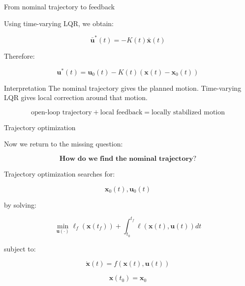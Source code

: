\documentclass[aspectratio=169]{beamer}
\begin{document}
\begin{frame}{From nominal trajectory to feedback}
\large

Using time-varying LQR, we obtain:

\[
\bar{\bm{u}}^*(t)
=
-K(t)\bar{\bm{x}}(t)
\]

Therefore:

\[
\boxed{
\bm{u}^*(t)
=
\bm{u}_0(t)
-
K(t)
\left(
\bm{x}(t)-\bm{x}_0(t)
\right)
}
\]

\vspace{0.4cm}

\begin{block}{Interpretation}
The nominal trajectory gives the planned motion.  
Time-varying LQR gives local correction around that motion.
\end{block}

\vspace{0.3cm}

\[
\text{open-loop trajectory}
+
\text{local feedback}
=
\text{locally stabilized motion}
\]

\end{frame}

\begin{frame}{Trajectory optimization}
\large

Now we return to the missing question:

\[
\textbf{How do we find the nominal trajectory?}
\]

\vspace{0.3cm}

Trajectory optimization searches for:

\[
\bm{x}_0(t), \bm{u}_0(t)
\]

by solving:

\[
\min_{\bm{u}(\cdot)}
\ell_f(\bm{x}(t_f))
+
\int_{t_0}^{t_f}
\ell(\bm{x}(t),\bm{u}(t))dt
\]

subject to:

\[
\dot{\bm{x}}(t)
=
f(\bm{x}(t),\bm{u}(t))
\]

\[
\bm{x}(t_0)=\bm{x}_0
\]

\end{frame}
\end{document}
